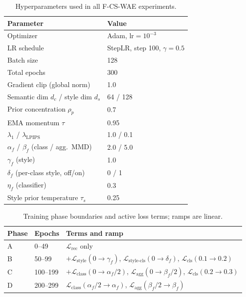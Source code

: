 \documentclass[letterpaper]{article} %
\newcommand{\ours}{F-CS-WAE}
\begin{document}
\begin{table}[h]
\centering
\small
\caption{Hyperparameters used in all \ours{} experiments.}
\begin{tabular}{ll}
\toprule
Parameter & Value \\
\midrule
Optimizer & Adam, $\mathrm{lr}=10^{-3}$ \\
LR schedule & StepLR, step 100, $\gamma=0.5$ \\
Batch size & 128 \\
Total epochs & 300 \\
Gradient clip (global norm) & 1.0 \\
Semantic dim $d_c$ / style dim $d_s$ & 64 / 128 \\
Prior concentration $\rho_p$ & 0.7 \\
EMA momentum $\tau$ & 0.95 \\
$\lambda_1$ / $\lambda_{\mathrm{LPIPS}}$ & 1.0 / 0.1 \\
$\alpha_f$ / $\beta_f$ (class / agg.\ MMD) & 2.0 / 5.0 \\
$\gamma_f$ (style) & 1.0 \\
$\delta_f$ (per-class style, off/on) & 0 / 1 \\
$\eta_f$ (classifier) & 0.3 \\
Style prior temperature $\tau_s$ & 0.25 \\
\bottomrule
\end{tabular}
\end{table}

\begin{table}[h]
\centering
\small
\caption{Training phase boundaries and active loss terms; ramps are linear.}
\begin{tabular}{lll}
\toprule
Phase & Epochs & Terms and ramp \\
\midrule
A & 0--49   & $\mathcal{L}_{\mathrm{rec}}$ only \\
B & 50--99  & $+\mathcal{L}_{\mathrm{style}}(0{\to}\gamma_f)$,
              $\mathcal{L}_{\mathrm{style\text{-}cls}}(0{\to}\delta_f)$,
              $\mathcal{L}_{\mathrm{cls}}(0.1{\to}0.2)$ \\
C & 100--199 & $+\mathcal{L}_{\mathrm{class}}(0{\to}\alpha_f/2)$,
               $\mathcal{L}_{\mathrm{agg}}(0{\to}\beta_f/2)$,
               $\mathcal{L}_{\mathrm{cls}}(0.2{\to}0.3)$ \\
D & 200--299 & $\mathcal{L}_{\mathrm{class}}(\alpha_f/2{\to}\alpha_f)$,
               $\mathcal{L}_{\mathrm{agg}}(\beta_f/2{\to}\beta_f)$ \\
\bottomrule
\end{tabular}
\end{table}
\end{document}

